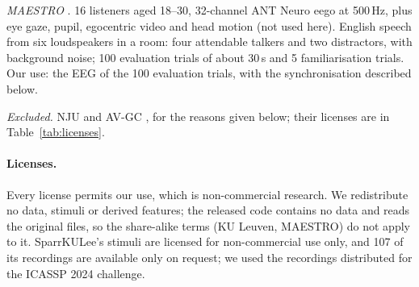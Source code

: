 \emph{MAESTRO} \citep{maestro2026}. 16 listeners aged 18--30, 32-channel ANT Neuro eego at
500\,Hz, plus eye gaze, pupil, egocentric video and head motion (not used here). English
speech from six loudspeakers in a room: four attendable talkers and two distractors, with
background noise; 100 evaluation trials of about 30\,s and 5 familiarisation trials. Our use:
the EEG of the 100 evaluation trials, with the synchronisation described below.

\emph{Excluded.} NJU \citep{zhang2023learnable} and AV-GC \citep{rotaru2024what}, for the
reasons given below; their licenses are in Table~\ref{tab:licenses}.

\paragraph{Licenses.} Every license permits our use, which is non-commercial research. We
redistribute no data, stimuli or derived features; the released code contains no data and
reads the original files, so the share-alike terms (KU Leuven, MAESTRO) do not apply to it. SparrKULee's stimuli
are licensed for non-commercial use only, and 107 of its recordings are available only on
request; we used the recordings distributed for the ICASSP 2024 challenge.
